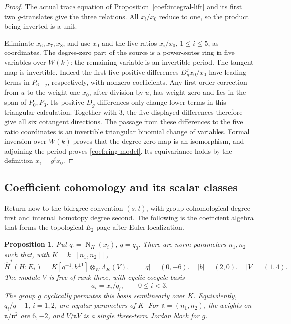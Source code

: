 \documentclass[11pt]{article}
\newtheorem{proposition}[theorem]{Proposition}
\theoremstyle{definition}
\theoremstyle{remark}
\numberwithin{equation}{section}
\begin{document}
\begin{proof}
The actual trace equation of Proposition~\ref{coef:integral-lift}
and its first two \(g\)-translates give the three relations.
All \(x_i/x_0\) reduce to one, so the product being inverted is a unit.

Eliminate \(x_6,x_7,x_8\), and use \(x_0\) and the five ratios
\(x_i/x_0\), \(1\le i\le5\), as coordinates.  The degree-zero part
of the source is a power-series ring in five variables over \(W(k)\);
the remaining variable is an invertible period.
The tangent map is invertible.  Indeed the first five positive
differences \(D_g^j x_0/x_0\) have leading terms in
\(P_{6-j}\), respectively, with nonzero coefficients.  Any
first-order correction from \(u\) to the weight-one \(x_0\), after
division by \(u\), has weight zero and lies in the span of \(P_0,P_3\).
Its positive \(D_g\)-differences only change lower terms in this
triangular calculation.  Together with \(3\), the five displayed
differences therefore give all six cotangent directions.
The passage from these differences to the five ratio coordinates
is an invertible triangular binomial change of variables.
Formal inversion over \(W(k)\) proves that the degree-zero map is an
isomorphism, and adjoining the period proves
\eqref{coef:ring-model}.  Its equivariance holds by the definition
\(x_i=g^i x_0\).
\end{proof}

\subsection{Coefficient cohomology and its scalar classes}

Return now to the bidegree convention \((s,t)\), with group cohomological
degree first and internal homotopy degree second.  The following is the
coefficient algebra that forms the topological \(E_2\)-page after
Euler localization.

\begin{proposition}\label{coef:h-cohomology}
Put \(q_i=\operatorname{N}_H(x_i)\), \(q=q_0\).  There are norm parameters \(n_1,n_2\)
such that, with \(K=k[[n_1,n_2]]\),
\begin{equation}\label{coef:h-tate-ring}
 \widehat H^*(H;E_*)=
 K[q^{\pm1},b^{\pm1}]\otimes_K\Lambda_K(V),
 \qquad |q|=(0,-6),\quad |b|=(2,0),\quad |V|=(1,4).
\end{equation}
The module \(V\) is free of rank three, with cyclic-cocycle basis
\[
 a_i=x_i/q_i,\qquad 0\le i<3.
\]
The group \(g\) cyclically permutes this basis semilinearly over \(K\).
Equivalently, \(q_i/q-1\), \(i=1,2\), are regular parameters of \(K\).
For \(\mathfrak n=(n_1,n_2)\), the weights on
\(\mathfrak n/\mathfrak n^2\) are \(6,-2\), and \(V/\mathfrak n V\)
is a single three-term Jordan block for \(g\).
\end{proposition}
\end{document}

